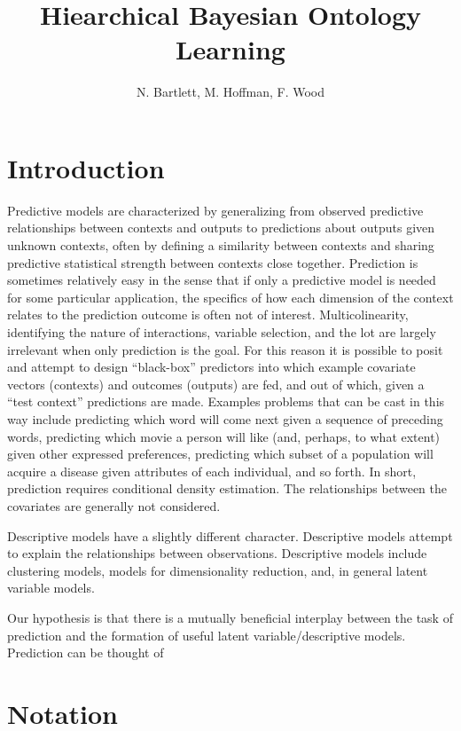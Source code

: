 \documentclass[11pt]{article}
\title{Hiearchical Bayesian Ontology Learning}
\author{N. Bartlett, M. Hoffman, F. Wood}
\begin{document}
\maketitle

\section{Introduction}

Predictive models are characterized by generalizing from observed predictive relationships between contexts and outputs to predictions about outputs given unknown contexts, often by defining a similarity between contexts and sharing predictive statistical strength between contexts close together.  Prediction is sometimes relatively easy in the sense that if only a predictive model is needed for some particular application, the specifics of how each dimension of the context relates to the prediction outcome is often not of interest.  Multicolinearity, identifying the nature of interactions, variable selection, and the lot are largely irrelevant when only prediction is the goal.  For this reason it is possible to posit and attempt to design ``black-box'' predictors into which example covariate vectors (contexts) and outcomes (outputs) are fed, and out of which, given a ``test context'' predictions are made.  Examples problems that can be cast in this way include predicting which word will come next given a sequence of preceding words, predicting which movie a person will like (and, perhaps, to what extent) given other expressed preferences, predicting which subset of a population will acquire a disease given attributes of each individual, and so forth.  In short, prediction requires conditional density estimation.  The relationships between the covariates are generally not considered.  

Descriptive models have a slightly different character.  Descriptive models attempt to explain the relationships between observations.  Descriptive models include clustering models, models for dimensionality reduction, and, in general latent variable models.

Our hypothesis is that there is a mutually beneficial interplay between the task of prediction and the formation of useful latent variable/descriptive models.  Prediction can be thought of 


\section{Notation}
\end{document}
